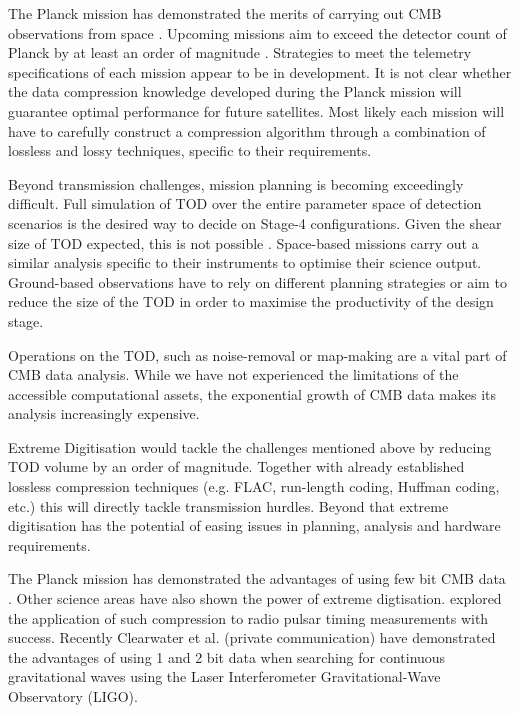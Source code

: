 \documentclass[apj]{emulateapj}
\begin{document}
The Planck mission has demonstrated the merits of carrying out CMB observations from space \citep{planck2018}. Upcoming missions aim to exceed the detector count of Planck by at least an order of magnitude \citep{litebird2014, pixie2011, core2018}. Strategies to meet the telemetry specifications of each mission appear to be in development. It is not clear whether the data compression knowledge developed during the Planck mission will guarantee optimal performance for future satellites. Most likely each mission will have to carefully construct a compression algorithm through a combination of lossless and lossy techniques, specific to their requirements.


Beyond transmission challenges, mission planning is becoming exceedingly difficult. Full simulation of TOD over the entire parameter space of detection scenarios is the desired way to decide on Stage-4 configurations. Given the shear size of TOD expected, this is not possible \citep{s4sciencebook}. Space-based missions carry out a similar analysis specific to their instruments to optimise their science output. Ground-based observations have to rely on different planning strategies or aim to reduce the size of the TOD in order to maximise the productivity of the design stage.


Operations on the TOD, such as noise-removal or map-making are a vital part of CMB data analysis. While we have not experienced the limitations of the accessible computational assets, the exponential growth of CMB data makes its analysis increasingly expensive.


Extreme Digitisation would tackle the challenges mentioned above by reducing TOD volume by an order of magnitude. Together with already established lossless compression techniques (e.g. FLAC, run-length coding, Huffman coding, etc.) this will directly tackle transmission hurdles. Beyond that extreme digitisation has the potential of easing issues in planning, analysis and hardware requirements.

The Planck mission has demonstrated the advantages of using few bit CMB data \citep{maris2003}. Other science areas have also shown the power of extreme digtisation. \cite{jenet1998} explored the application of such compression to radio pulsar timing measurements with success. Recently Clearwater et al. (private communication) have demonstrated the advantages of using 1 and 2 bit data when searching for continuous gravitational waves using the Laser Interferometer Gravitational-Wave Observatory (LIGO).
\end{document}
